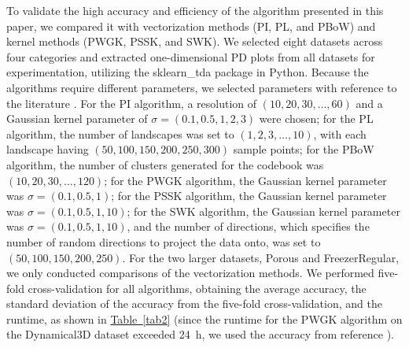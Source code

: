 \documentclass[5GeSdc,ASOC,numref,printGA,printHL,CASflow,nocrossmark,longtitle,PROOF]{/usr/local/texlive/iTemplates/01-Templates/01-Els-Jnl/01-Standard_Templates/V1/ELS_MDL5-V1-6}
\begin{document}
\begin{articlestyle}
To validate the high accuracy and efficiency of the algorithm presented in this paper, we compared it with vectorization methods (PI, PL, and PBoW) and kernel methods (PWGK, PSSK, and SWK). We selected eight datasets across four categories and extracted one-dimensional PD plots from all datasets for experimentation, utilizing the sklearn\_tda package in Python. {Because the algorithms require different parameters, we selected parameters with reference to the literature \cite{zielinski2021persistence,dong2024persistence}.} For the PI algorithm, a resolution of $(10,20,30,\ldots,60)$ and a Gaussian kernel parameter of $\sigma = (0.1, 0.5, 1, 2, 3)$ were chosen; for the PL algorithm, the number of landscapes was set to $(1, 2, 3,\ldots,10)$, with each landscape having $(50, 100, 150, 200, 250, 300)$ sample points; for the PBoW algorithm, the number of clusters generated for the codebook was $(10, 20, 30,\ldots,120)$; for the PWGK algorithm, the Gaussian kernel parameter was $\sigma = (0.1, 0.5, 1)$; for the PSSK algorithm, the Gaussian kernel parameter was $\sigma = (0.1, 0.5, 1, 10)$; for the SWK algorithm, the Gaussian kernel parameter was $\sigma = (0.1, 0.5, 1, 10)$, and the number of directions, which specifies the number of random directions to project the data onto, was set to $(50, 100, 150, 200, 250)$. For the two larger datasets, Porous and FreezerRegular, we only conducted comparisons of the vectorization methods. We performed five-fold cross-validation for all algorithms, obtaining the average accuracy, the standard \nobreak{}deviation of the accuracy from the five-fold cross-validation, and the runtime, as shown in \hyperref[tab2]{Table~\ref{tab2}} (since the runtime for the PWGK algorithm on the Dynamical3D dataset exceeded 24~h, we used the accuracy from reference \cite{dong2024persistence}).\enlargethispage*{-6pt}



\end{articlestyle}
\end{document}

